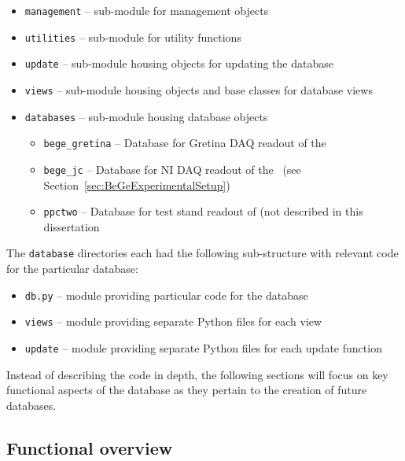 			\lstset{language=sh}
			\begin{itemize}
		  	  	\setlength{\itemsep}{0.5pt}
		  	  	\setlength{\parskip}{0pt}
		  	  	\setlength{\parsep}{0pt}
				\item[] \lstinline!management! -- sub-module for management objects 
				\item[] \lstinline!utilities! -- sub-module for utility functions 
				\item[] \lstinline!update! -- sub-module housing objects for updating the database 
				\item[] \lstinline!views! -- sub-module housing objects and base classes for database views 
				\item[] \lstinline!databases! -- sub-module housing database objects 
				\begin{itemize}
		  	  		\setlength{\itemsep}{0.5pt}
		  	  		\setlength{\parskip}{0pt}
		  	  		\setlength{\parsep}{0pt}
					\item[] \lstinline!bege_gretina! -- Database for Gretina DAQ readout of the \bege 
					\item[] \lstinline!bege_jc! -- Database for NI DAQ readout of the \bege~(see Section~\ref{sec:BeGeExperimentalSetup}) 
					\item[] \lstinline!ppctwo! -- Database for test stand readout of  (not described in this dissertation 
				\end{itemize}
			\end{itemize}
The \lstinline!database! directories each had the following sub-structure with relevant code for the particular database:
			\begin{itemize}
		  	  	\setlength{\itemsep}{0.5pt}
		  	  	\setlength{\parskip}{0pt}
		  	  	\setlength{\parsep}{0pt}
				\item[] \lstinline!db.py! -- module providing particular code for the database 
				\item[] \lstinline!views! -- module providing separate Python files for each view 
				\item[] \lstinline!update! -- module providing separate Python files for each update function 
			\end{itemize}
	
Instead of describing the code in
depth, the following sections will focus on key functional aspects of the
database as they pertain to the creation of future databases.  

		\subsection{Functional overview}
		
